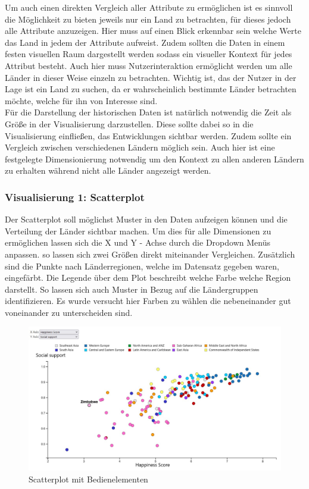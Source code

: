 Um auch einen direkten Vergleich aller Attribute zu ermöglichen ist es sinnvoll die Möglichkeit zu bieten jeweils nur ein Land zu betrachten, für dieses jedoch alle Attribute anzuzeigen. Hier muss auf einen Blick erkennbar sein welche Werte das Land in jedem der Attribute aufweist. Zudem sollten die Daten in einem festen visuellen Raum dargestellt werden sodass ein visueller Kontext für jedes Attribut besteht. Auch hier muss Nutzerinteraktion ermöglicht werden um alle Länder in dieser Weise einzeln zu betrachten. Wichtig ist, das der Nutzer in der Lage ist ein Land zu suchen, da er wahrscheinlich bestimmte Länder betrachten möchte, welche für ihn von Interesse sind.\\

Für die Darstellung der historischen Daten ist natürlich notwendig die Zeit als Größe in der Visualisierung darzustellen. Diese sollte dabei so in die Visualisierung einfließen, das Entwicklungen sichtbar werden. Zudem sollte ein Vergleich zwischen verschiedenen Ländern möglich sein. Auch hier ist eine festgelegte Dimensionierung notwendig um den Kontext zu allen anderen Ländern zu erhalten während nicht alle Länder angezeigt werden.  

\subsubsection{Visualisierung 1: Scatterplot}

Der Scatterplot soll möglichst Muster in den Daten aufzeigen können und die Verteilung der Länder sichtbar machen. Um dies für alle Dimensionen zu ermöglichen lassen sich die X und Y - Achse durch die Dropdown Menüs anpassen. so lassen sich zwei Größen direkt miteinander Vergleichen. Zusätzlich sind die Punkte nach Länderregionen, welche im Datensatz gegeben waren, eingefärbt. Die Legende über dem Plot beschreibt welche Farbe welche Region darstellt. So lassen sich auch Muster in Bezug auf die Ländergruppen identifizieren. Es wurde versucht hier Farben zu wählen die nebeneinander gut voneinander zu unterscheiden sind. \\

\begin{figure}[h]
 \centering
 \includegraphics[width = \textwidth]{img/scatterplot.jpg}
 \caption{Scatterplot mit Bedienelementen}
 \label{fig:scatterplot}
\end{figure}
\vspace{0.5cm}

